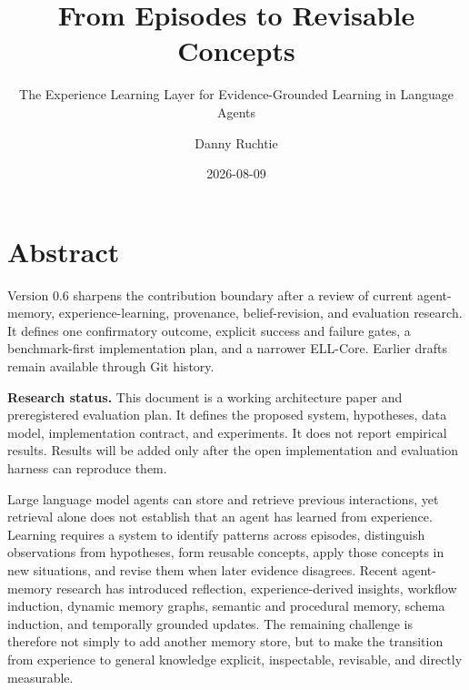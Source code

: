 \documentclass[
  english,
  a4paper,
  DIV=11,
  numbers=noendperiod]{scrreprt}
\title{From Episodes to Revisable Concepts}
\subtitle{The Experience Learning Layer for Evidence-Grounded Learning
in Language Agents}
\author{Danny Ruchtie}
\date{2026-08-09}
\renewcommand*\contentsname{Table of contents}
\newcommand\contentsname{Table of contents}
\begin{document}
\maketitle

\renewcommand*\contentsname{Table of contents}
{
\setcounter{tocdepth}{2}
\tableofcontents
}


\chapter*{Abstract}\label{abstract}


\begin{tcolorbox}[enhanced jigsaw, arc=.35mm, bottomrule=.15mm, bottomtitle=1mm, breakable, colback=white, colbacktitle=quarto-callout-note-color!10!white, colframe=quarto-callout-note-color-frame, coltitle=black, left=2mm, leftrule=.75mm, opacityback=0, opacitybacktitle=0.6, rightrule=.15mm, title=\textcolor{quarto-callout-note-color}{\faInfo}\hspace{0.5em}{Living working draft v0.6 - 9 August 2026}, titlerule=0mm, toprule=.15mm, toptitle=1mm]

Version 0.6 sharpens the contribution boundary after a review of current
agent-memory, experience-learning, provenance, belief-revision, and
evaluation research. It defines one confirmatory outcome, explicit
success and failure gates, a benchmark-first implementation plan, and a
narrower ELL-Core. Earlier drafts remain available through Git history.

\textbf{Research status.} This document is a working architecture paper
and preregistered evaluation plan. It defines the proposed system,
hypotheses, data model, implementation contract, and experiments. It
does not report empirical results. Results will be added only after the
open implementation and evaluation harness can reproduce them.

\end{tcolorbox}

Large language model agents can store and retrieve previous
interactions, yet retrieval alone does not establish that an agent has
learned from experience. Learning requires a system to identify patterns
across episodes, distinguish observations from hypotheses, form reusable
concepts, apply those concepts in new situations, and revise them when
later evidence disagrees. Recent agent-memory research has introduced
reflection, experience-derived insights, workflow induction, dynamic
memory graphs, semantic and procedural memory, schema induction, and
temporally grounded updates. The remaining challenge is therefore not
simply to add another memory store, but to make the transition from
experience to general knowledge explicit, inspectable, revisable, and
directly measurable.
\end{document}
